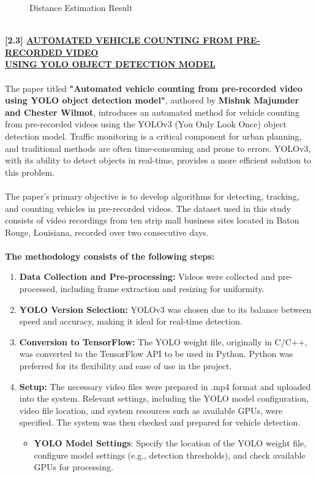 {\begin{figure}[h!]
    \caption{Distance Estimation Result}
\end{figure}\\
%
%
\noindent
{\textbf{[2.3] \underline{AUTOMATED VEHICLE COUNTING FROM PRE-RECORDED VIDEO } \\ \underline{USING YOLO OBJECT DETECTION MODEL}}}\\\\
%
The paper titled \textbf{"Automated vehicle counting from pre-recorded video using YOLO object detection model"}, authored by \textbf{Mishuk Majumder and Chester Wilmot}, introduces an automated method for vehicle counting from pre-recorded videos using the YOLOv3 (You Only Look Once) object detection model. Traffic monitoring is a critical component for urban planning, and traditional methods are often time-consuming and prone to errors. YOLOv3, with its ability to detect objects in real-time, provides a more efficient solution to this problem.\\\\
%
The paper's primary objective is to develop algorithms for detecting, tracking, and counting vehicles in pre-recorded videos. The dataset used in this study consists of video recordings from ten strip mall business sites located in Baton Rouge, Louisiana, recorded over two consecutive days.\\\\
%
%
\textbf{The methodology consists of the following steps:}
\begin{enumerate}
  \item \textbf{Data Collection and Pre-processing:} Videos were collected and pre-processed, including frame extraction and resizing for uniformity.
  \item \textbf{YOLO Version Selection:} YOLOv3 was chosen due to its balance between speed and accuracy, making it ideal for real-time detection.
  \item \textbf{Conversion to TensorFlow:} The YOLO weight file, originally in C/C++, was converted to the TensorFlow API to be used in Python. Python was preferred for its flexibility and ease of use in the project.
  \item \textbf{Setup:} The necessary video files were prepared in .mp4 format and uploaded into the system. Relevant settings, including the YOLO model configuration, video file location, and system resources such as available GPUs, were specified. The system was then checked and prepared for vehicle detection.
  \begin{itemize}
    \item \textbf{YOLO Model Settings}: Specify the location of the YOLO weight file, configure model settings (e.g., detection thresholds), and check available GPUs for processing.

\end{itemize}
\end{enumerate}}
